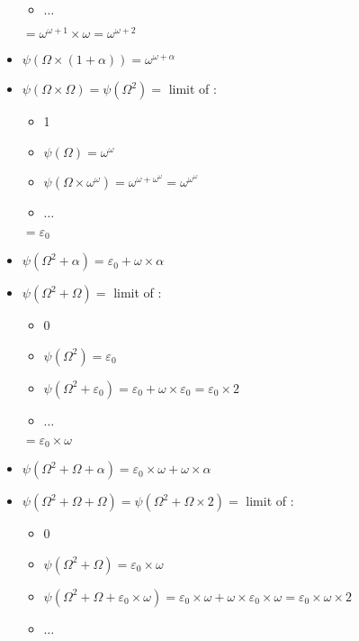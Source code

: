 \documentclass[10pt]{article}
\begin{document}
\begin{itemize}
\begin{itemize}
   \item \( \ldots \)
   \end{itemize}
   \( = \omega^{\omega+1} \times \omega = \omega^{\omega+2} \)
\item \( \psi(\Omega \times (1+\alpha)) = \omega^{\omega+\alpha} \)
\item \( \psi(\Omega \times \Omega) = \psi(\Omega^2) = \) limit of :
   \begin{itemize}
     \setlength{\itemsep}{1pt}
     \setlength{\parskip}{0pt}
     \setlength{\parsep}{0pt}
   \item 1
   \item \( \psi(\Omega) = \omega^\omega \)
   \item \( \psi(\Omega \times \omega^\omega) = \omega^{\omega+\omega^\omega} = \omega^{\omega^\omega} \)
   \item \( \ldots \)
   \end{itemize} 
   \( = \varepsilon_0 \)
\item \( \psi(\Omega^2+\alpha) = \varepsilon_0+\omega \times \alpha \)
\item \( \psi(\Omega^2 + \Omega) = \) limit of :
   \begin{itemize}
     \setlength{\itemsep}{1pt}
     \setlength{\parskip}{0pt}
     \setlength{\parsep}{0pt}
   \item 0
   \item \( \psi(\Omega^2) = \varepsilon_0 \)
   \item \( \psi(\Omega^2+\varepsilon_0) = \varepsilon_0+\omega \times \varepsilon_0 = \varepsilon_0 \times 2 \)
   \item \( \ldots \)
   \end{itemize}
   \( = \varepsilon_0 \times \omega \)
\item \( \psi(\Omega^2+\Omega+\alpha) = \varepsilon_0 \times \omega + \omega \times \alpha \)
\item \( \psi(\Omega^2+\Omega+\Omega) = \psi(\Omega^2+\Omega \times 2) = \) limit of :
   \begin{itemize}
     \setlength{\itemsep}{1pt}
     \setlength{\parskip}{0pt}
     \setlength{\parsep}{0pt}
   \item 0
   \item \( \psi(\Omega^2+\Omega) = \varepsilon_0 \times \omega \)
   \item \( \psi(\Omega^2+\Omega+\varepsilon_0 \times \omega) = \varepsilon_0 \times \omega + \omega \times \varepsilon_0 \times \omega = \varepsilon_0 \times \omega \times 2 \)
   \item \( \ldots \)

\end{itemize}
\end{itemize}
\end{document}
